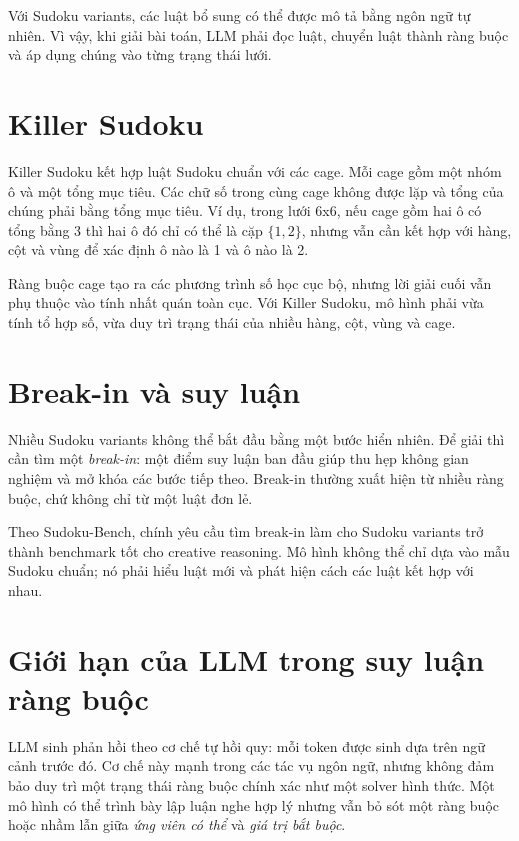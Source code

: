\documentclass[12pt,a4paper,oneside]{report}
\newlength{\manualparindent}
\newcommand{\manualindent}{\hspace*{\manualparindent}}
\begin{document}
Với Sudoku variants, các luật bổ sung có thể được mô tả bằng ngôn ngữ tự nhiên. Vì vậy, khi giải bài toán, LLM phải đọc luật, chuyển luật thành ràng buộc và áp dụng chúng vào từng trạng thái lưới.

\section{Killer Sudoku}

\manualindent%
Killer Sudoku kết hợp luật Sudoku chuẩn với các cage. Mỗi cage gồm một nhóm ô và một tổng mục tiêu. Các chữ số trong cùng cage không được lặp và tổng của chúng phải bằng tổng mục tiêu. Ví dụ, trong lưới 6x6, nếu cage gồm hai ô có tổng bằng 3 thì hai ô đó chỉ có thể là cặp \(\{1,2\}\), nhưng vẫn cần kết hợp với hàng, cột và vùng để xác định ô nào là 1 và ô nào là 2.

\manualindent%
Ràng buộc cage tạo ra các phương trình số học cục bộ, nhưng lời giải cuối vẫn phụ thuộc vào tính nhất quán toàn cục. Với Killer Sudoku, mô hình phải vừa tính tổ hợp số, vừa duy trì trạng thái của nhiều hàng, cột, vùng và cage.

\section{Break-in và suy luận}

\manualindent%
Nhiều Sudoku variants không thể bắt đầu bằng một bước hiển nhiên. Để giải thì cần tìm một \textit{break-in}: một điểm suy luận ban đầu giúp thu hẹp không gian nghiệm và mở khóa các bước tiếp theo. Break-in thường xuất hiện từ nhiều ràng buộc, chứ không chỉ từ một luật đơn lẻ.

\manualindent%
Theo Sudoku-Bench, chính yêu cầu tìm break-in làm cho Sudoku variants trở thành benchmark tốt cho creative reasoning. Mô hình không thể chỉ dựa vào mẫu Sudoku chuẩn; nó phải hiểu luật mới và phát hiện cách các luật kết hợp với nhau.

\section{Giới hạn của LLM trong suy luận ràng buộc}

\manualindent%
LLM sinh phản hồi theo cơ chế tự hồi quy: mỗi token được sinh dựa trên ngữ cảnh trước đó. Cơ chế này mạnh trong các tác vụ ngôn ngữ, nhưng không đảm bảo duy trì một trạng thái ràng buộc chính xác như một solver hình thức. Một mô hình có thể trình bày lập luận nghe hợp lý nhưng vẫn bỏ sót một ràng buộc hoặc nhầm lẫn giữa \textit{ứng viên có thể} và \textit{giá trị bắt buộc}.
\end{document}

